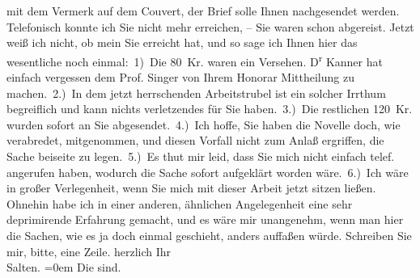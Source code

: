 \begin{ledgroupsized}[t]{13cm}
               mit dem Vermerk auf dem Couvert, der Brief solle Ihnen nachgesendet werden.
               Telefonisch konnte ich Sie nicht mehr erreichen, – Sie waren schon abgereist. Jetzt
               weiß ich nicht, ob mein \label{K_L03334-1v}\label{K_L03334-1h} Sie erreicht hat, und so sage ich Ihnen hier das wesentliche noch
               einmal: 1) Die 80 Kr. waren ein Versehen. D\textsuperscript{r}{ }Kanner hat einfach vergessen dem Prof. Singer von Ihrem Honorar Mittheilung zu
               machen. 2.) In dem jetzt herrschenden Arbeitstrubel ist ein solcher Irrthum
               begreiflich und kann nichts verletzendes für Sie haben. 3.) Die restlichen 120 Kr.
               wurden sofort an Sie abgesendet. 4.) Ich hoffe, Sie haben die Novelle doch, wie verabredet, mitgenommen,
               und diesen Vorfall nicht zum Anlaß ergriffen, die Sache beiseite zu legen. 5.) Es
               thut mir leid, dass Sie mich nicht einfach telef. angerufen haben, wodurch die Sache
               sofort aufgeklärt worden wäre. 6.) Ich wäre in großer Verlegenheit, wenn Sie mich mit
               dieser Arbeit jetzt sitzen ließen.\pend
           \pstart
           Ohnehin habe ich in einer anderen, ähnlichen Angelegenheit eine sehr deprimirende
               Erfahrung gemacht, und es wäre mir unangenehm, wenn man hier die Sachen, wie es ja
               doch einmal geschieht, anders auffaßen würde. Schreiben Sie mir, bitte, eine
               Zeile.\pend
           \pstart
           herzlich Ihr {\\[\baselineskip]}\spacefill\mbox{Salten.}\pend
           \leftskip=0em{}\pstart
           \noindent{}\label{K_L03334-2v}\label{K_L03334-2h} Die \label{K_L03334-3v}\label{K_L03334-3h} sind.\pend
           
         
         \endnumbering{}\end{ledgroupsized}  \newcommand{\dateiname}{L03334}\newcommand{\titel}{Felix Salten an Arthur Schnitzler, 4. 9. 1902}\newcommand{\editorInnen}{Martin Anton Müller und Laura Untner}
      